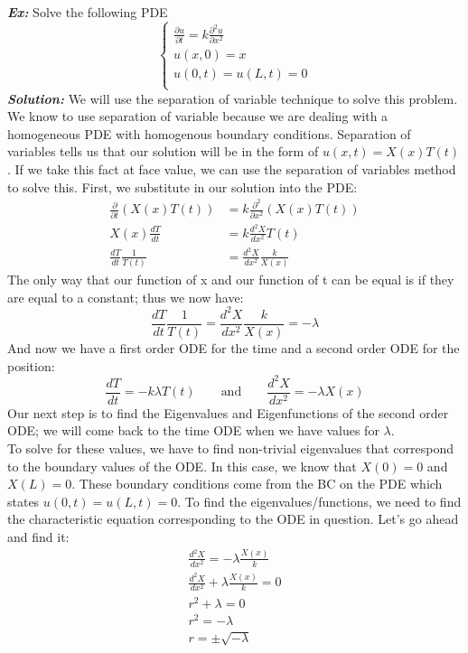 \documentclass{article}
\begin{document}
\noindent \textbf{\textit{Ex:}} Solve the following PDE
\[
\begin{cases}
\frac{\partial u}{\partial t} = k \frac{\partial^{2} u}{\partial x^{2}}\\
u(x,0) = x\\
u(0,t) = u(L,t) = 0\\
\end{cases}
\]
\indent \textbf{\textit{Solution:}} We will use the separation of variable
technique to solve this problem. We know to use separation of variable because
we are dealing with a homogeneous PDE with homogenous boundary conditions.
Separation of variables tells us that our solution will be in the form of
$u(x,t) = X(x)T(t)$. If we take this fact at face value, we can use the
separation of variables method to solve this. First, we substitute in our solution
into the PDE:
\begin{align*}
\frac{\partial}{\partial t}(X(x)T(t)) &= k \frac{\partial^{2}}{\partial x^{2}}(X(x)T(t))\\
X(x)\frac{dT}{dt} &= k\frac{d^{2}X}{dx^{2}}T(t)\\
\frac{dT}{dt}\frac{1}{T(t)} &= \frac{d^{2}X}{dx^{2}}\frac{k}{X(x)}
\end{align*}
\noindent The only way that our function of x and our function of t can be equal
is if they are equal to a constant; thus we now have:
\[
\frac{dT}{dt}\frac{1}{T(t)} = \frac{d^{2}X}{dx^{2}}\frac{k}{X(x)} = -\lambda
\]
\noindent And now we have a first order ODE for the time and a second order ODE
for the position:
\[
\frac{dT}{dt} = -k \lambda T(t) \qquad\text{and}\qquad \frac{d^{2}X}{dx^{2}} = -\lambda X(x)
\]
\noindent Our next step is to find the Eigenvalues and Eigenfunctions of the
second order ODE; we will come back to the time ODE when we have values for
$\lambda$.\\
\indent To solve for these values, we have to find non-trivial eigenvalues that
correspond to the boundary values of the ODE. In this case, we know that
$X(0) = 0$ and $X(L) = 0$. These boundary conditions come from the BC on the PDE
which states $u(0,t) = u(L,t) = 0$. To find the eigenvalues/functions, we need
to find the characteristic equation corresponding to the ODE in question. Let's
go ahead and find it:
\begin{gather*}
\frac{d^{2}X}{dx^{2}} = -\lambda \frac{X(x)}{k}\\
\frac{d^{2}X}{dx^{2}}  + \lambda \frac{X(x)}{k} = 0\\
r^{2} + \lambda = 0\\
r^{2} = -\lambda\\
r = \pm \sqrt{- \lambda}
\end{gather*}
\end{document}
